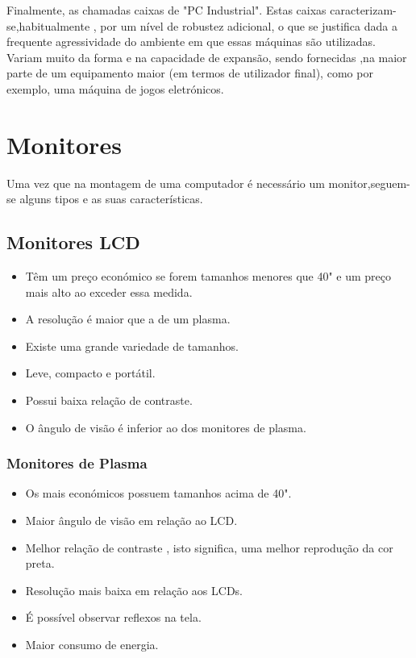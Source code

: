 Finalmente, as chamadas caixas de "PC Industrial". Estas caixas caracterizam-se,habitualmente , por um nível de robustez adicional, o que se justifica dada a frequente agressividade do ambiente em que essas máquinas são utilizadas. Variam muito da forma e na capacidade de expansão, sendo fornecidas ,na maior parte de um equipamento maior (em termos de utilizador final), como por exemplo, uma máquina de jogos eletrónicos. 

\chapter{Monitores}
\label{chap.monitores}
Uma vez que na montagem de uma computador é necessário um monitor,seguem-se alguns tipos e as suas características.

\section{Monitores LCD}
\begin{itemize}
	\item Têm um preço económico se forem tamanhos menores que 40" e um preço mais alto ao exceder essa medida.
	\item A resolução é maior que a de um plasma.
	\item Existe uma grande variedade de tamanhos.
	\item Leve, compacto e portátil.
	\item Possui baixa relação de contraste.
	\item O ângulo de visão é inferior ao dos monitores de plasma.
\end{itemize}

\subsection{Monitores de Plasma}
\begin{itemize}
	\item Os mais económicos possuem tamanhos acima de 40".
	\item Maior ângulo de visão em relação ao LCD.
	\item Melhor relação de contraste , isto significa, uma melhor reprodução da cor preta. 
	\item Resolução mais baixa em relação aos LCDs.
	\item É possível observar reflexos na tela.
	\item Maior consumo de energia.
\end{itemize}

